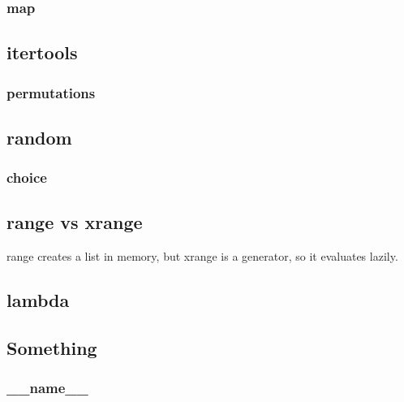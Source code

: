 \documentclass[12pt]{article}
\begin{document}
\subsubsection{map}





\subsection{itertools}

\subsubsection{permutations}





\subsection{random}

\subsubsection{choice}





\subsection{range vs xrange}

range creates a list in memory, but xrange is a generator, so it evaluates lazily.




\subsection{lambda}




\subsection{Something}

\subsubsection{\_\_name\_\_}
\end{document}
